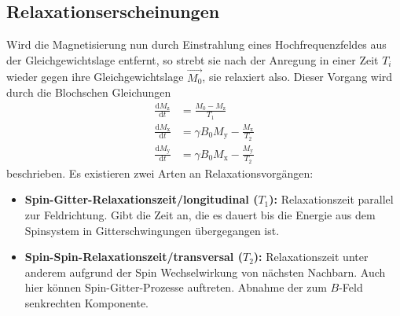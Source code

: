 \subsection{Relaxationserscheinungen}
Wird die Magnetisierung nun durch Einstrahlung eines Hochfrequenzfeldes
aus der Gleichgewichtslage entfernt, so strebt sie nach der Anregung in einer Zeit $T_{i}$
wieder gegen ihre Gleichgewichtslage $\vec{M_{0}}$, sie relaxiert also.
Dieser Vorgang wird durch die Blochschen Gleichungen
\begin{align}
		\frac{\text{d} M_\text{z}}{\text{d} t} &= \frac{M_0 - M_\text{z}}{T_1} \\
		\frac{\text{d} M_\text{x}}{\text{d} t} &= \gamma B_0 M_\text{y} -
		\frac{M_\text{x}}{T_2} \\
		\frac{\text{d} M_\text{y}}{\text{d} t} &= \gamma B_0 M_\text{x} - \frac{M_\text{y}}{T_2}
\end{align}
beschrieben.
Es existieren zwei Arten an Relaxationsvorgängen:
\begin{itemize}
		\item \textbf{Spin-Gitter-Relaxationszeit/longitudinal ($T_{1}$):}
				Relaxationszeit parallel zur Feldrichtung. Gibt die Zeit
				an, die es dauert bis die Energie aus dem Spinsystem in Gitterschwingungen
				übergegangen ist.
		\item \textbf{Spin-Spin-Relaxationszeit/transversal ($T_{2}$):} Relaxationszeit
				unter anderem aufgrund der Spin Wechselwirkung von nächsten
				Nachbarn. Auch hier können Spin-Gitter-Prozesse
        auftreten. Abnahme der zum $B$-Feld senkrechten Komponente.
\end{itemize}

